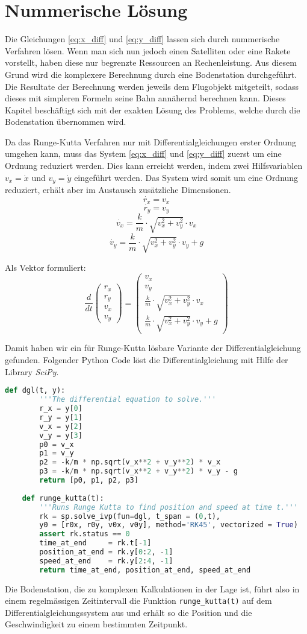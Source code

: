 \section{Nummerische Lösung
\label{perturbation:section:nummerischeloesung}}
Die Gleichungen \ref{eq:x_diff} und \ref{eq:y_diff} lassen sich durch nummerische Verfahren lösen. 
Wenn man sich nun jedoch einen Satelliten oder eine Rakete vorstellt, haben diese nur begrenzte Ressourcen an Rechenleistung. 
Aus diesem Grund wird die komplexere Berechnung durch eine Bodenstation durchgeführt. 
Die Resultate der Berechnung werden jeweils dem Flugobjekt mitgeteilt, sodass dieses mit simpleren Formeln seine Bahn annähernd berechnen kann. 
Dieses Kapitel beschäftigt sich mit der exakten Lösung des Problems, welche durch die Bodenstation übernommen wird.

Da das Runge-Kutta Verfahren nur mit Differentialgleichungen erster Ordnung umgehen kann, muss das System \ref{eq:x_diff} und \ref{eq:y_diff} zuerst um eine Ordnung reduziert werden. 
Dies kann erreicht werden, indem zwei Hilfsvariablen $v_x = \dot{x}$ und $v_y = \dot{y}$ eingeführt werden. 
Das System wird somit um eine Ordnung reduziert, erhält aber im Austausch zusätzliche Dimensionen.
\[
\dot{r_x} = v_x
\]
\[
\dot{r_y} = v_y
\]
\[
\dot{v_x} = \frac{k}{m} \cdot \sqrt{v_x^2 + v_y^2} \cdot v_x
\]
\[
\dot{v_y} = \frac{k}{m} \cdot \sqrt{v_x^2 + v_y^2} \cdot v_y + g   
\]

Als Vektor formuliert:
\[
\frac{d}{dt}\begin{pmatrix}r_x\\r_y\\v_x\\v_y\end{pmatrix} = \begin{pmatrix}v_x\\v_y\\\frac{k}{m} \cdot \sqrt{v_x^2 + v_y^2} \cdot v_x\\\frac{k}{m} \cdot \sqrt{v_x^2 + v_y^2} \cdot v_y + g\end{pmatrix}
\]

Damit haben wir ein für Runge-Kutta lösbare Variante der Differentialgleichung gefunden. 
Folgender Python Code löst die Differentialgleichung mit Hilfe der Library \textit{SciPy}.

\begin{lstlisting}[language=Python]
    def dgl(t, y):
        '''The differential equation to solve.'''
        r_x = y[0]
        r_y = y[1]
        v_x = y[2]
        v_y = y[3]
        p0 = v_x
        p1 = v_y
        p2 = -k/m * np.sqrt(v_x**2 + v_y**2) * v_x
        p3 = -k/m * np.sqrt(v_x**2 + v_y**2) * v_y - g
        return [p0, p1, p2, p3]
    
    def runge_kutta(t):
        '''Runs Runge Kutta to find position and speed at time t.'''
        rk = sp.solve_ivp(fun=dgl, t_span = (0,t), 
        y0 = [r0x, r0y, v0x, v0y], method='RK45', vectorized = True)
        assert rk.status == 0
        time_at_end     = rk.t[-1]
        position_at_end = rk.y[0:2, -1]
        speed_at_end    = rk.y[2:4, -1]
        return time_at_end, position_at_end, speed_at_end
    \end{lstlisting}

    Die Bodenstation, die zu komplexen Kalkulationen in der Lage ist, führt also in einem regelmässigen Zeitintervall die Funktion \lstinline[language=Python]{runge_kutta(t)} auf dem Differentialgleichungssystem aus und erhält so die Position und die Geschwindigkeit zu einem bestimmten Zeitpunkt.
